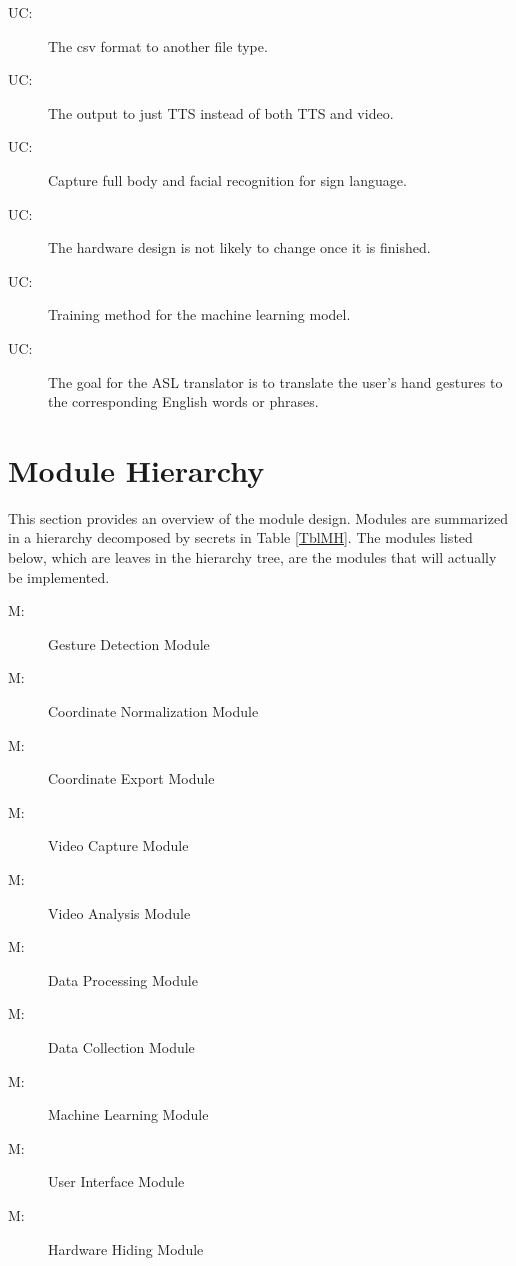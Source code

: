 \documentclass[12pt, titlepage]{article}
\newcounter{ucnum}
\newcommand{\uctheucnum}{UC\theucnum}
\newcounter{mnum}
\newcommand{\mthemnum}{M\themnum}
\begin{document}
\begin{description}
\item[ \uctheucnum \label{uc1}:] The csv format to another file type.
\item[ \uctheucnum \label{uc2}:] The output to just TTS instead of both TTS and video.
\item[ \uctheucnum \label{uc3}:] Capture full body and facial recognition for sign language.
\item[ \uctheucnum \label{uc4}:] The hardware design is not likely to change once it is finished.
\item[ \uctheucnum \label{uc5}:] Training method for the machine learning model.
\item[ \uctheucnum \label{uc6}:] The goal for the ASL translator is to translate the user’s hand gestures to the corresponding English words or phrases.
\end{description}

\section{Module Hierarchy} \label{SecMH}

This section provides an overview of the module design. Modules are summarized
in a hierarchy decomposed by secrets in Table \ref{TblMH}. The modules listed
below, which are leaves in the hierarchy tree, are the modules that will
actually be implemented.

\begin{description}
\item [ \mthemnum \label{m1}:] Gesture Detection Module
\item [ \mthemnum \label{m2}:] Coordinate Normalization Module
\item [ \mthemnum \label{m3}:] Coordinate Export Module
\item [ \mthemnum \label{m4}:] Video Capture Module
\item [ \mthemnum \label{m5}:] Video Analysis Module
\item [ \mthemnum \label{m6}:] Data Processing Module
\item [ \mthemnum \label{m7}:] Data Collection Module
\item [ \mthemnum \label{m8}:] Machine Learning Module
\item [ \mthemnum \label{m9}:] User Interface Module
\item [ \mthemnum \label{m10}:] Hardware Hiding Module
\end{description}
\end{document}
